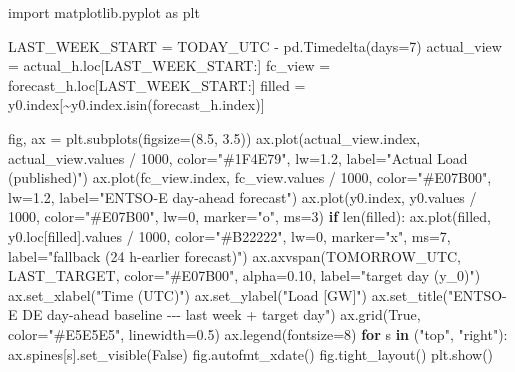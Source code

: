 \documentclass[
  english,
  letterpaper,
]{scrbook}
\newenvironment{Shaded}{\begin{snugshade}}{\end{snugshade}}
\newcommand{\BuiltInTok}[1]{\textcolor[rgb]{0.00,0.23,0.31}{#1}}
\newcommand{\ControlFlowTok}[1]{\textcolor[rgb]{0.00,0.23,0.31}{\textbf{#1}}}
\newcommand{\DecValTok}[1]{\textcolor[rgb]{0.68,0.00,0.00}{#1}}
\newcommand{\FloatTok}[1]{\textcolor[rgb]{0.68,0.00,0.00}{#1}}
\newcommand{\ImportTok}[1]{\textcolor[rgb]{0.00,0.46,0.62}{#1}}
\newcommand{\KeywordTok}[1]{\textcolor[rgb]{0.00,0.23,0.31}{\textbf{#1}}}
\newcommand{\NormalTok}[1]{\textcolor[rgb]{0.00,0.23,0.31}{#1}}
\newcommand{\OperatorTok}[1]{\textcolor[rgb]{0.37,0.37,0.37}{#1}}
\newcommand{\StringTok}[1]{\textcolor[rgb]{0.13,0.47,0.30}{#1}}
\newcommand{\VariableTok}[1]{\textcolor[rgb]{0.07,0.07,0.07}{#1}}
\begin{document}
\begin{Shaded}
\begin{Highlighting}[]
\ImportTok{import}\NormalTok{ matplotlib.pyplot }\ImportTok{as}\NormalTok{ plt}

\NormalTok{LAST\_WEEK\_START }\OperatorTok{=}\NormalTok{ TODAY\_UTC }\OperatorTok{{-}}\NormalTok{ pd.Timedelta(days}\OperatorTok{=}\DecValTok{7}\NormalTok{)}
\NormalTok{actual\_view }\OperatorTok{=}\NormalTok{ actual\_h.loc[LAST\_WEEK\_START:]}
\NormalTok{fc\_view }\OperatorTok{=}\NormalTok{ forecast\_h.loc[LAST\_WEEK\_START:]}
\NormalTok{filled }\OperatorTok{=}\NormalTok{ y0.index[}\OperatorTok{\textasciitilde{}}\NormalTok{y0.index.isin(forecast\_h.index)]}

\NormalTok{fig, ax }\OperatorTok{=}\NormalTok{ plt.subplots(figsize}\OperatorTok{=}\NormalTok{(}\FloatTok{8.5}\NormalTok{, }\FloatTok{3.5}\NormalTok{))}
\NormalTok{ax.plot(actual\_view.index, actual\_view.values }\OperatorTok{/} \DecValTok{1000}\NormalTok{, color}\OperatorTok{=}\StringTok{"\#1F4E79"}\NormalTok{,}
\NormalTok{        lw}\OperatorTok{=}\FloatTok{1.2}\NormalTok{, label}\OperatorTok{=}\StringTok{"Actual Load (published)"}\NormalTok{)}
\NormalTok{ax.plot(fc\_view.index, fc\_view.values }\OperatorTok{/} \DecValTok{1000}\NormalTok{, color}\OperatorTok{=}\StringTok{"\#E07B00"}\NormalTok{,}
\NormalTok{        lw}\OperatorTok{=}\FloatTok{1.2}\NormalTok{, label}\OperatorTok{=}\StringTok{"ENTSO{-}E day{-}ahead forecast"}\NormalTok{)}
\NormalTok{ax.plot(y0.index, y0.values }\OperatorTok{/} \DecValTok{1000}\NormalTok{, color}\OperatorTok{=}\StringTok{"\#E07B00"}\NormalTok{, lw}\OperatorTok{=}\DecValTok{0}\NormalTok{, marker}\OperatorTok{=}\StringTok{"o"}\NormalTok{, ms}\OperatorTok{=}\DecValTok{3}\NormalTok{)}
\ControlFlowTok{if} \BuiltInTok{len}\NormalTok{(filled):}
\NormalTok{    ax.plot(filled, y0.loc[filled].values }\OperatorTok{/} \DecValTok{1000}\NormalTok{, color}\OperatorTok{=}\StringTok{"\#B22222"}\NormalTok{, lw}\OperatorTok{=}\DecValTok{0}\NormalTok{,}
\NormalTok{            marker}\OperatorTok{=}\StringTok{"x"}\NormalTok{, ms}\OperatorTok{=}\DecValTok{7}\NormalTok{, label}\OperatorTok{=}\StringTok{"fallback (24 h{-}earlier forecast)"}\NormalTok{)}
\NormalTok{ax.axvspan(TOMORROW\_UTC, LAST\_TARGET, color}\OperatorTok{=}\StringTok{"\#E07B00"}\NormalTok{, alpha}\OperatorTok{=}\FloatTok{0.10}\NormalTok{,}
\NormalTok{           label}\OperatorTok{=}\StringTok{"target day (y\_0)"}\NormalTok{)}
\NormalTok{ax.set\_xlabel(}\StringTok{"Time (UTC)"}\NormalTok{)}
\NormalTok{ax.set\_ylabel(}\StringTok{"Load [GW]"}\NormalTok{)}
\NormalTok{ax.set\_title(}\StringTok{"ENTSO{-}E DE day{-}ahead baseline {-}{-}{-} last week + target day"}\NormalTok{)}
\NormalTok{ax.grid(}\VariableTok{True}\NormalTok{, color}\OperatorTok{=}\StringTok{"\#E5E5E5"}\NormalTok{, linewidth}\OperatorTok{=}\FloatTok{0.5}\NormalTok{)}
\NormalTok{ax.legend(fontsize}\OperatorTok{=}\DecValTok{8}\NormalTok{)}
\ControlFlowTok{for}\NormalTok{ s }\KeywordTok{in}\NormalTok{ (}\StringTok{"top"}\NormalTok{, }\StringTok{"right"}\NormalTok{):}
\NormalTok{    ax.spines[s].set\_visible(}\VariableTok{False}\NormalTok{)}
\NormalTok{fig.autofmt\_xdate()}
\NormalTok{fig.tight\_layout()}
\NormalTok{plt.show()}
\end{Highlighting}
\end{Shaded}
\end{document}
